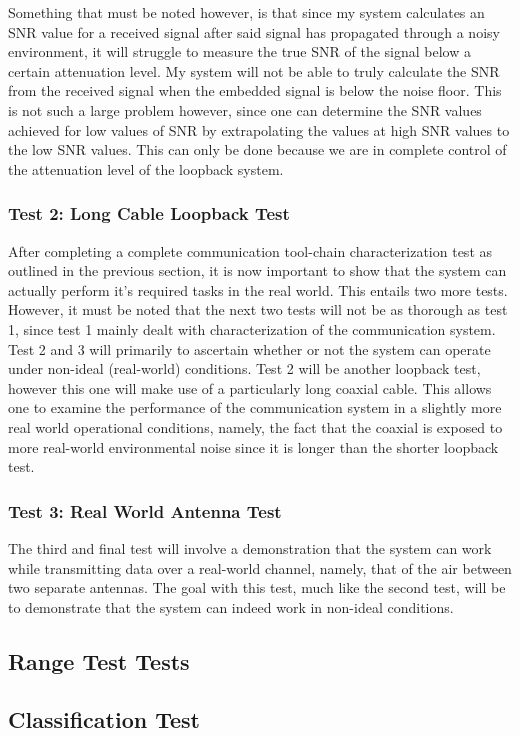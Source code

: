 \documentclass[class=report,11pt,crop=false]{standalone}
\begin{document}
Something that must be noted however, is that since my system calculates an SNR value for a received signal after said signal has propagated through a noisy environment, it will struggle to measure the true SNR of the signal below a certain attenuation level. My system will not be able to truly calculate the SNR from the received signal when the embedded signal is below the noise floor. This is not such a large problem however, since one can determine the SNR values achieved for low values of SNR by extrapolating the values at high SNR values to the low SNR values. This can only be done because we are in complete control of the attenuation level of the loopback system.

\subsubsection{Test 2: Long Cable Loopback Test}
After completing a complete communication tool-chain characterization test as outlined in the previous section, it is now important to show that the system can actually perform it's required tasks in the real world. This entails two more tests. However, it must be noted that the next two tests will not be as thorough as test 1, since test 1 mainly dealt with characterization of the communication system. Test 2 and 3 will primarily to ascertain whether or not the system can operate under non-ideal (real-world) conditions. Test 2 will be another loopback test, however this one will make use of a particularly long coaxial cable. This allows one to examine the performance of the communication system in a slightly more real world operational conditions, namely, the fact that the coaxial is exposed to more real-world environmental noise since it is longer than the shorter loopback test.

\subsubsection{Test 3: Real World Antenna Test}
The third and final test will involve a demonstration that the system can work while transmitting data over a real-world channel, namely, that of the air between two separate antennas. The goal with this test, much like the second test, will be to demonstrate that the system can indeed work in non-ideal conditions.







\subsection{Range Test Tests}

\subsection{Classification Test}

\cite{christian_wolff_classification_nodate}

\ifstandalone



\printnoidxglossary[type=\acronymtype,nonumberlist]
\fi
\end{document}
